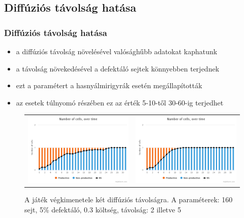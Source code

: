 \subsection{Diffúziós távolság hatása}
\begin{frame}
\frametitle{Diffúziós távolság hatása}
\begin{itemize}
	\item a diffúziós távolság növelésével valósághűbb adatokat kaphatunk
	\item a távolság növekedésével a defektáló sejtek könnyebben terjednek
	\item ezt a paramétert a hasnyálmirigyrák esetén megállapították\cite{archetti2015heterogeneity}
\item az esetek túlnyomó részében ez az érték 5-10-től 30-60-ig terjedhet\cite{archetti2016cooperation}
\end{itemize}

\begin{figure}[h]
	\centering
	\begin{tabular}{cc}
		\includegraphics[width=0.4\linewidth]{images/diffdist2}
		&
		\includegraphics[width=0.4\linewidth]{images/diffdist5}
	\end{tabular}
	\caption{A játék végkimenetele két diffúziós távolságra. A paraméterek: 160 sejt, 5\% defektáló, 0.3 költség, távolság: 2 illetve 5}
	\label{fig:DiffDist}
\end{figure}
\end{frame}

